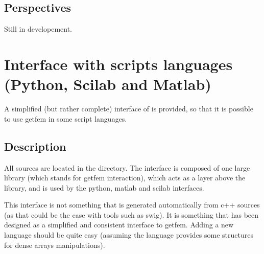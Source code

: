 \documentclass[a4paper,11pt,english]{sphinxmanual}
\begin{document}
\subsection{Perspectives}
\label{\detokenize{project/libdesc_cont:perspectives}}
Still in developement.


\section{Interface with scripts languages (Python, Scilab and Matlab)}
\label{\detokenize{project/libdesc_interface:interface-with-scripts-languages-python-scilab-and-matlab}}\label{\detokenize{project/libdesc_interface:dp-libdesc-interface}}\label{\detokenize{project/libdesc_interface::doc}}
A simplified (but rather complete) interface of  is provided, so that it is possible to use getfem in some script languages.


\subsection{Description}
\label{\detokenize{project/libdesc_interface:description}}
All sources are located in the  directory. The interface is
composed of one large library  (which stands for getfem
interaction), which acts as a layer above the  library, and is used by
the python, matlab and scilab interfaces.

This interface is not something that is generated automatically from c++ sources
(as that could be the case with tools such as swig). It is something that has
been designed as a simplified and consistent interface to getfem. Adding a new
language should be quite easy (assuming the language provides some structures
for dense arrays manipulations).
\end{document}
